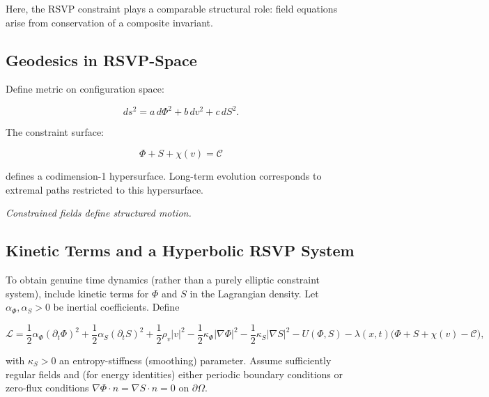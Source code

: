 \documentclass[12pt,a4paper]{article}
\theoremstyle{definition}
\begin{document}
Here, the RSVP constraint plays a comparable structural role:
field equations arise from conservation of a composite invariant.

\subsection{Geodesics in RSVP-Space}

Define metric on configuration space:

\begin{equation}
  ds^2
  =
  a\, d\Phi^2
  + b\, dv^2
  + c\, dS^2.
\end{equation}

The constraint surface:

\begin{equation}
  \Phi + S + \chi(v) = \mathcal{C}
\end{equation}

defines a codimension-1 hypersurface.
Long-term evolution corresponds to extremal paths
restricted to this hypersurface.

\medskip
\begin{center}
  \itshape
  Constrained fields define structured motion.
\end{center}

\subsection{Kinetic Terms and a Hyperbolic RSVP System}
\label{subsec:rsvp_hyperbolic}

To obtain genuine time dynamics (rather than a purely elliptic constraint
system), include kinetic terms for $\Phi$ and $S$ in the Lagrangian density.
Let $\alpha_\Phi,\alpha_S>0$ be inertial coefficients.  Define

\begin{equation}
  \mathcal{L}
  =
  \frac{1}{2}\alpha_\Phi (\partial_t \Phi)^2
  + \frac{1}{2}\alpha_S (\partial_t S)^2
  + \frac{1}{2}\rho_v |v|^2
  - \frac{1}{2}\kappa_\Phi |\nabla \Phi|^2
  - \frac{1}{2}\kappa_S |\nabla S|^2
  - U(\Phi,S)
  - \lambda(x,t)\big(\Phi + S + \chi(v) - \mathcal{C}\big),
  \label{eq:Ldensity_hyperbolic}
\end{equation}

with $\kappa_S>0$ an entropy-stiffness (smoothing) parameter.
Assume sufficiently regular fields and (for energy identities) either periodic
boundary conditions or zero-flux conditions
$\nabla \Phi \cdot n = \nabla S \cdot n = 0$ on $\partial \Omega$.
\end{document}
